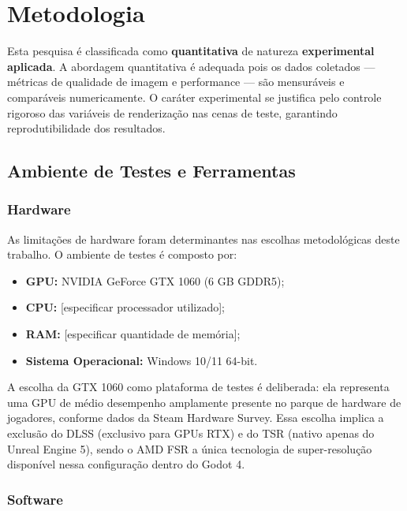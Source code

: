 \documentclass[twoside,english,brazilian]{UNISINOSmonografia}
\begin{document}
\chapter{Metodologia}

Esta pesquisa é classificada como \textbf{quantitativa} de natureza \textbf{experimental aplicada}. A abordagem quantitativa é adequada pois os dados coletados — métricas de qualidade de imagem e performance — são mensuráveis e comparáveis numericamente. O caráter experimental se justifica pelo controle rigoroso das variáveis de renderização nas cenas de teste, garantindo reprodutibilidade dos resultados.

\section{Ambiente de Testes e Ferramentas}

\subsection{Hardware}

As limitações de hardware foram determinantes nas escolhas metodológicas deste trabalho. O ambiente de testes é composto por:

\begin{itemize}
    \item \textbf{GPU:} NVIDIA GeForce GTX 1060 (6 GB GDDR5);
    \item \textbf{CPU:} [especificar processador utilizado];
    \item \textbf{RAM:} [especificar quantidade de memória];
    \item \textbf{Sistema Operacional:} Windows 10/11 64-bit.
\end{itemize}

A escolha da GTX 1060 como plataforma de testes é deliberada: ela representa uma GPU de médio desempenho amplamente presente no parque de hardware de jogadores, conforme dados da Steam Hardware Survey. Essa escolha implica a exclusão do DLSS (exclusivo para GPUs RTX) e do TSR (nativo apenas do Unreal Engine 5), sendo o AMD FSR a única tecnologia de super-resolução disponível nessa configuração dentro do Godot 4.

\subsection{Software}
\end{document}
